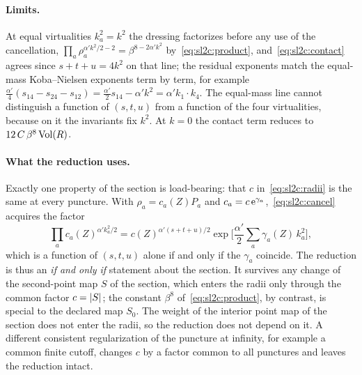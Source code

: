 \paragraph{Limits.}
At equal virtualities $k_a^2 = k^2$ the dressing factorizes before any use of the cancellation, $\prod_a \rho_a^{\alpha' k^2 / 2 - 2} = \beta^{8 - 2 \alpha' k^2}$ by~\eqref{eq:sl2c:product}, and~\eqref{eq:sl2c:contact} agrees since $s + t + u = 4 k^2$ on that line; the residual exponents match the equal-mass Koba--Nielsen exponents term by term, for example $\frac{\alpha'}{4} (s_{14} - s_{24} - s_{12}) = \frac{\alpha'}{2} s_{14} - \alpha' k^2 = \alpha' k_1 \cdot k_4$.
The equal-mass line cannot distinguish a function of $(s, t, u)$ from a function of the four virtualities, because on it the invariants fix $k^2$.
At $k = 0$ the contact term reduces to $12 \, C \, \beta^8 \operatorname{Vol}(R)$.

\paragraph{What the reduction uses.}
Exactly one property of the section is load-bearing: that $c$ in~\eqref{eq:sl2c:radii} is the same at every puncture.
With $\rho_a = c_a(Z) P_a$ and $c_a = c \, \mathrm{e}^{\gamma_a}$,~\eqref{eq:sl2c:cancel} acquires the factor
\begin{equation}
  \prod_a c_a(Z)^{\alpha' k_a^2 / 2}
    = c(Z)^{\alpha' (s + t + u) / 2} \exp\Big[ \frac{\alpha'}{2} \sum_a \gamma_a(Z) \, k_a^2 \Big],
\end{equation}
which is a function of $(s, t, u)$ alone if and only if the $\gamma_a$ coincide.
The reduction is thus an \emph{if and only if} statement about the section.
It survives any change of the second-point map $S$ of the section, which enters the radii only through the common factor $c = {|S|}$; the constant $\beta^8$ of~\eqref{eq:sl2c:product}, by contrast, is special to the declared map $S_0$.
The weight of the interior point map of the section does not enter the radii, so the reduction does not depend on it.
A different consistent regularization of the puncture at infinity, for example a common finite cutoff, changes $c$ by a factor common to all punctures and leaves the reduction intact.

